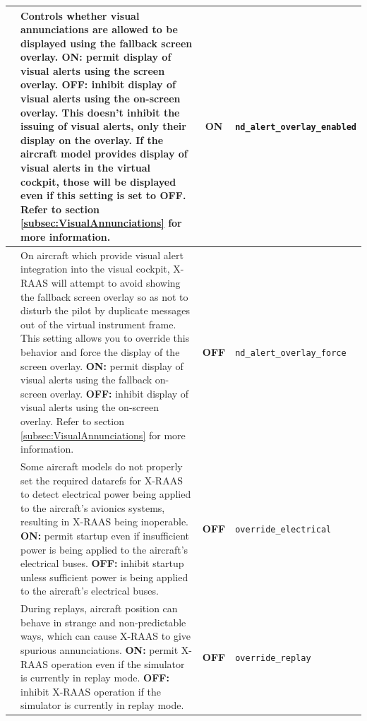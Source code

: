 \documentclass[a4paper,12pt]{article}
\newcommand{\confopt}[1]{\texttt{#1}}
\begin{document}
{\begin{center}
\begin{supertabular}{|c|p{8cm}|c|l|}
\hline

 &
Controls whether visual annunciations are allowed to be displayed using
the fallback screen overlay.\newline
\textbf{ON:} permit display of visual alerts using the screen
overlay.\newline
\textbf{OFF:} inhibit display of visual alerts using the on-screen
overlay.\newline
This doesn't inhibit the issuing of visual alerts, only their display on
the overlay. If the aircraft model provides display of visual alerts in
the virtual cockpit, those will be displayed even if this setting is set
to OFF. Refer to section \ref{subsec:VisualAnnunciations} for more
information. & \textbf{ON} & \confopt{nd\_alert\_overlay\_enabled} \\

\hline

 &
On aircraft which provide visual alert integration into the visual
cockpit, X-RAAS will attempt to avoid showing the fallback screen overlay
so as not to disturb the pilot by duplicate messages out of the virtual
instrument frame. This setting allows you to override this behavior and
force the display of the screen overlay.\newline
\textbf{ON:} permit display of visual alerts using the fallback on-screen
overlay.\newline
\textbf{OFF:} inhibit display of visual alerts using the on-screen
overlay.\newline
Refer to section \ref{subsec:VisualAnnunciations} for more information. &
\textbf{OFF} & \confopt{nd\_alert\_overlay\_force} \\

\hline

 &
Some aircraft models do not properly set the required datarefs for X-RAAS
to detect electrical power being applied to the aircraft's avionics
systems, resulting in X-RAAS being inoperable.\newline
\textbf{ON:} permit startup even if insufficient power is being applied to
the aircraft's electrical buses.\newline
\textbf{OFF:} inhibit startup unless sufficient power is being applied to
the aircraft's electrical buses. & \textbf{OFF} &
\confopt{override\_electrical} \\

\hline

 &
During replays, aircraft position can behave in strange and
non-predictable ways, which can cause X-RAAS to give spurious
annunciations.\newline
\textbf{ON:} permit X-RAAS operation even if the simulator is currently in
replay mode.\newline
\textbf{OFF:} inhibit X-RAAS operation if the simulator is currently in
replay mode. & \textbf{OFF} & \confopt{override\_replay} \\


\end{supertabular}
\end{center}}
\end{document}
